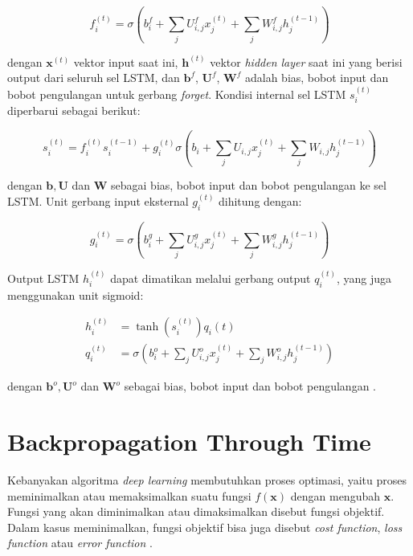 \begin{equation}
    f_{i}^{(t)} = \sigma\left(b_{i}^{f} + \sum_{j} U_{i,j}^{f} x_{j}^{(t)} + \sum_{j} W_{i,j}^{f} h_{j}^{(t-1)}\right)
\end{equation}

\noindent
dengan $\pmb{x}^{(t)}$ vektor input saat ini, $\pmb{h}^{(t)}$ vektor \textit{hidden layer} saat ini yang berisi output dari seluruh sel LSTM, dan $\pmb{b}^{f}$, $\pmb{U}^{f}$, $\pmb{W}^{f}$ adalah bias, bobot input dan bobot pengulangan untuk gerbang \textit{forget}. Kondisi internal sel LSTM $s_{i}^{(t)}$ diperbarui sebagai berikut:

\begin{equation}
    s_{i}^{(t)} = f_{i}^{(t)}  s_{i}^{(t-1)} + g_{i}^{(t)} \sigma\left(b_{i} + \sum_{j} U_{i,j} x_{j}^{(t)} + \sum_{j} W_{i,j} h_{j}^{(t-1)} \right)
\end{equation}

\noindent
dengan $\pmb{b}, \pmb{U}$ dan $\pmb{W}$ sebagai bias, bobot input dan bobot pengulangan ke sel LSTM\@. Unit gerbang input eksternal $g_{i}^{(t)}$ dihitung dengan:

\begin{equation}
    g_{i}^{(t)} = \sigma\left(b_{i}^{g} + \sum_{j} U_{i,j}^{g} x_{j}^{(t)} + \sum_{j} W_{i,j}^{g} h_{j}^{(t-1)}\right)
\end{equation}

Output LSTM $h_{i}^{(t)}$ dapat dimatikan melalui gerbang output $q_{i}^{(t)}$, yang juga menggunakan unit sigmoid:

\begin{align}
    h_{i}^{(t)} &= \tanh\left(s_{i}^{(t)}\right) q_{i}{(t)} \\
    q_{i}^{(t)} &= \sigma\left(b_{i}^{o} + \sum_{j} U_{i,j}^{o} x_{j}^{(t)} + \sum_{j} W_{i,j}^{o} h_{j}^{(t-1)} \right)
\end{align}

\noindent
dengan $\pmb{b}^{o}, \pmb{U}^{o}$ dan $\pmb{W}^{o}$ sebagai bias, bobot input dan bobot pengulangan \citep{goodfellow-2016}.



\section{Backpropagation Through Time}
Kebanyakan algoritma \textit{deep learning} membutuhkan proses optimasi, yaitu proses meminimalkan atau memaksimalkan suatu fungsi $f(\pmb{x})$ dengan mengubah $\pmb{x}$. Fungsi yang akan diminimalkan atau dimaksimalkan disebut fungsi objektif. Dalam kasus meminimalkan, fungsi objektif bisa juga disebut \textit{cost function}, \textit{loss function} atau \textit{error function} \citep{goodfellow-2016}.

